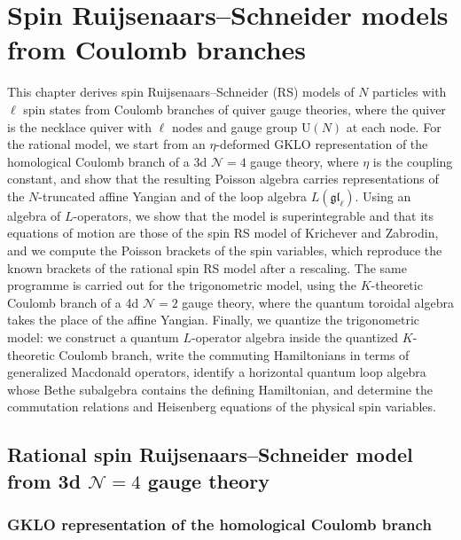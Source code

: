 
\chapter{Spin Ruijsenaars--Schneider models from Coulomb branches}\label{chap:spinRSCB}

\begin{chapterabstract}
	This chapter derives spin Ruijsenaars--Schneider (RS) models of $N$ particles with $\ell$ spin states from Coulomb branches of quiver gauge theories, where the quiver is the necklace quiver with $\ell$ nodes and gauge group $\mathrm{U}(N)$ at each node. For the rational model, we start from an $\eta$-deformed GKLO representation of the homological Coulomb branch of a 3d $\mathcal{N}=4$ gauge theory, where $\eta$ is the coupling constant, and show that the resulting Poisson algebra carries representations of the $N$-truncated affine Yangian and of the loop algebra $L(\mathfrak{gl}_\ell)$. Using an algebra of $L$-operators, we show that the model is superintegrable and that its equations of motion are those of the spin RS model of Krichever and Zabrodin, and we compute the Poisson brackets of the spin variables, which reproduce the known brackets of the rational spin RS model after a rescaling. The same programme is carried out for the trigonometric model, using the $K$-theoretic Coulomb branch of a 4d $\mathcal{N}=2$ gauge theory, where the quantum toroidal algebra takes the place of the affine Yangian. Finally, we quantize the trigonometric model: we construct a quantum $L$-operator algebra inside the quantized $K$-theoretic Coulomb branch, write the commuting Hamiltonians in terms of generalized Macdonald operators, identify a horizontal quantum loop algebra whose Bethe subalgebra contains the defining Hamiltonian, and determine the commutation relations and Heisenberg equations of the physical spin variables.
\end{chapterabstract}

\section{Rational spin Ruijsenaars--Schneider model from 3d $\mathcal{N}=4$ gauge theory}

\subsection{GKLO representation of the homological Coulomb branch}

